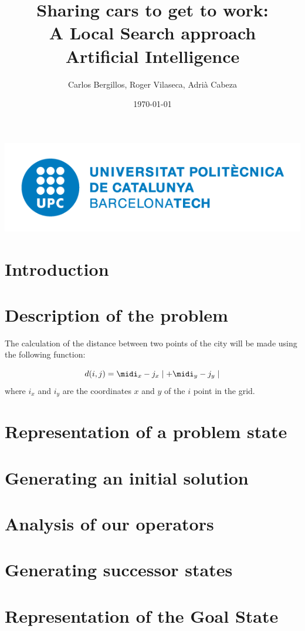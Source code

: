 \documentclass[12]{article}
\author{Carlos Bergillos, Roger Vilaseca, Adrià Cabeza}
\title{\textbf{Sharing cars to get to work:\\ A Local Search approach}\\ \bigskip Artificial Intelligence}
\date{\today}
\begin{document}
\maketitle
\vspace*{\fill}
\begin{center}
\includegraphics[scale=0.5]{images/UPClogo.png}
\end{center}

\newpage
\tableofcontents
\newpage
\section{Introduction}


\section{Description of the problem}

The calculation of the distance between two points of the city will be made using the following function: 

$$ d(i,j) = \midi_x - j_x\mid+ \midi_y - j_y\mid $$
where $i_x$ and $i_y$ are the coordinates $x$ and $y$ of the $i$ point in the grid. 
\section{Representation of a problem state}
\section{Generating an initial solution}
\section{Analysis of our operators}
\section{Generating successor states}
\section{Representation of the Goal State}
\end{document}
